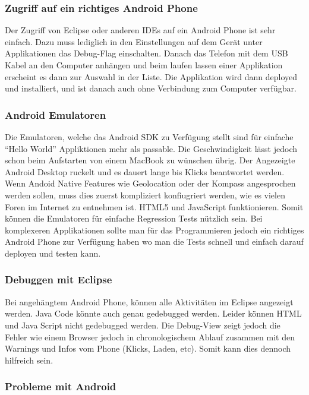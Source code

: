 \subsubsection{Zugriff auf ein richtiges Android Phone} %
\label{ssub:Zugriff auf ein richtiges Android Phone}
Der Zugriff von Eclipse oder anderen IDEs auf ein Android Phone ist sehr einfach. Dazu muss lediglich in den Einstellungen auf dem Gerät unter Applikationen das Debug-Flag einschalten. Danach das Telefon mit dem USB Kabel an den Computer anhängen und beim laufen lassen einer Applikation erscheint es dann zur Auswahl in der Liste. Die Applikation wird dann deployed und installiert, und ist danach auch ohne Verbindung zum Computer verfügbar.

\subsubsection{Android Emulatoren} %
\label{ssub:Android Emulatoren}
Die Emulatoren, welche das Android SDK zu Verfügung stellt sind für einfache "`Hello World"' Appliktionen mehr als passable. Die Geschwindigkeit lässt jedoch schon beim Aufstarten von einem MacBook zu wünschen übrig. Der Angezeigte Android Desktop ruckelt und es dauert lange bis Klicks beantwortet werden. Wenn Andoid Native Features wie Geolocation oder der Kompass angesprochen werden sollen, muss dies zuerst kompliziert konfiugriert werden, wie es vielen Foren im Internet zu entnehmen ist. HTML5 und JavaScript funktionieren. Somit können die Emulatoren für einfache Regression Tests nützlich sein. Bei komplexeren Applikationen sollte man für das Programmieren jedoch ein richtiges Android Phone zur Verfügung haben wo man die Tests schnell und einfach darauf deployen und testen kann.

\subsubsection{Debuggen mit Eclipse} %
\label{ssub:Debuggen mit Eclipse}
Bei angehängtem Android Phone, können alle Aktivitäten im Eclipse angezeigt werden. Java Code könnte auch genau gedebugged werden. Leider können HTML und Java Script nicht gedebugged werden. Die Debug-View zeigt jedoch die Fehler wie einem Browser jedoch in chronologischem Ablauf zusammen mit den Warnings und Infos vom Phone (Klicks, Laden, etc). Somit kann dies dennoch hilfreich sein. 

\subsubsection{Probleme mit Android} %
\label{ssub:probleme_mit_android}


